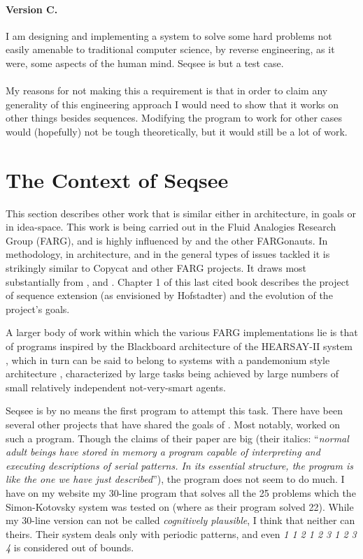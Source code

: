 \documentclass[letterpaper]{article}
\begin{document}
\paragraph{Version C.}  I am designing and implementing a system to solve some hard problems not easily amenable to traditional computer science, by reverse engineering, as it were, some aspects of the human mind.  Seqsee is but a test case.

\paragraph{} My reasons for not making this a requirement is that in order to claim any generality of this engineering approach I would need to show that it works on other things besides sequences.  Modifying the program to work for other cases would (hopefully) not be tough theoretically, but it would still be a lot of work.

\tableofcontents

\section{The Context of Seqsee}
\label{sec:context}

This section describes other work that is similar either in architecture, in goals or in idea-space. This work is being carried out in the Fluid Analogies Research Group (FARG), and is highly influenced by \hof and the other FARGonauts. In methodology, in architecture, and in the general types of issues tackled it is strikingly similar to Copycat and other FARG projects. It draws most substantially from ,  and . Chapter 1 of this last cited book describes the project of sequence extension (as envisioned by Hofstadter) and the evolution of the project's goals.

A larger body of work within which the various FARG implementations lie is that of programs inspired by the Blackboard architecture of the HEARSAY-II system \cite{Reddy}, which in turn can be said to belong to systems with a pandemonium style architecture \cite{Dennett:Consciousness}, characterized by large tasks being achieved by large numbers of small relatively independent not-very-smart agents. 

Seqsee is by no means the first program to attempt this task. There have been several other projects that have shared the  goals of \seq. Most notably,  worked on such a program. Though the claims of their paper are big (their italics: ``\emph{normal adult beings have stored in memory a program capable of interpreting and executing descriptions of serial patterns. In its essential structure, the program is like the one we have just described}''), the program does not seem to do much. I have on my website \cite{Mahabal:simon} my 30-line program that solves all the 25 problems which the Simon-Kotovsky system was tested on (where as their program solved 22). While my 30-line version can not be called \emph{cognitively plausible}, I think that neither can theirs. Their system deals only with periodic patterns, and even \emph{1 1 2 1 2 3 1 2 3 4} is considered out of bounds.
\end{document}
